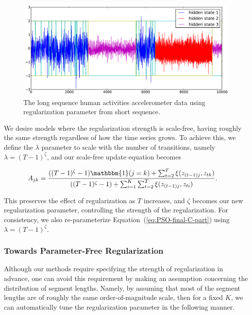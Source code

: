 \documentclass[letterpaper]{article}
\begin{document}
\begin{figure}[htbp]
  \centering
    \includegraphics[width=0.8\linewidth]{images/MAP_results_hard_activity_long_3_states.pdf}    
      \vspace{-0.5cm}
  \caption{\small{The long sequence human activities accelerometer data using
  regularization parameter from short sequence.}}
  \vspace{-1cm}
  \label{fig:long-real-data}
\end{figure}

We desire models where the regularization strength is scale-free, having roughly the same strength regardless of how the time series grows. To achieve this, we define the $\lambda$ parameter to scale with the number of transitions, namely $\lambda = (T-1)^\zeta$, and our scale-free update equation becomes

\vspace{-0.5cm}
\begin{align}\label{eq:SCALE-FREE-MAP}
    A_{jk} &= \frac{((T - 1)^{\zeta}-1){\mathbbm{1}(j = k)} + \sum_{t=2}^{T} \xi(z_{(t-1)j}, z_{tk})}   
    {((T - 1)^{\zeta} - 1) + \sum_{i=1}^{K}\sum_{t=2}^{T} \xi(z_{(t-1)j}, z_{ti})}.
\end{align}
\vspace{-0.1cm}

This preserves the effect of regularization as $T$ increases, and $\zeta$
becomes our new regularization parameter, controlling the strength of the
regularization. For consistency, we also re-parameterize
Equation~(\ref{eq:PSO-final-C-part}) using $\lambda = (T-1)^\zeta$.
\vspace{-0.1cm}
\subsubsection{Towards Parameter-Free Regularization}\label{sec:param-free}
\vspace{-0.1cm}
Although our methods require specifying the strength of regularization in advance, one can avoid this requirement by making an assumption concerning the distribution of segment lengths. Namely, by assuming that most of the segment lengths are of roughly the same order-of-magnitude scale, then for a fixed $K$, we can automatically tune the regularization parameter in the following manner.
\end{document}
